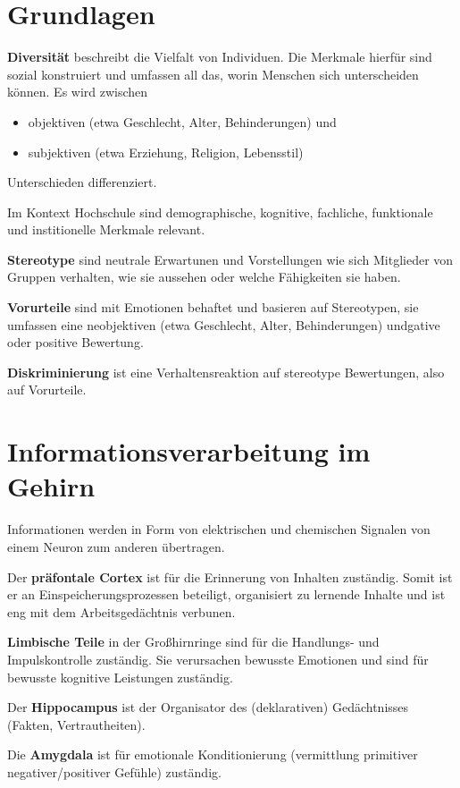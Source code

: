 \documentclass[twocolumn]{article}
\newcommand{\term}[1]{\textbf{#1}}
\begin{document}
\section{Grundlagen}

\term{Diversität} beschreibt die Vielfalt von Individuen. Die Merkmale hierfür sind sozial konstruiert und umfassen all das, worin Menschen sich unterscheiden können. Es wird zwischen 
\begin{itemize}
    \item objektiven (etwa Geschlecht, Alter, Behinderungen) und
    \item subjektiven (etwa Erziehung, Religion, Lebensstil)
\end{itemize} 
Unterschieden differenziert.

Im Kontext Hochschule sind demographische, kognitive, fachliche, funktionale und institionelle Merkmale relevant.

\term{Stereotype} sind neutrale Erwartunen und Vorstellungen wie sich Mitglieder von Gruppen verhalten, wie sie aussehen oder welche Fähigkeiten sie haben.

\term{Vorurteile} sind mit Emotionen behaftet und basieren auf Stereotypen, sie umfassen eine neobjektiven (etwa Geschlecht, Alter, Behinderungen) undgative oder positive Bewertung.

\term{Diskriminierung} ist eine Verhaltensreaktion auf stereotype Bewertungen, also auf Vorurteile.

\section{Informationsverarbeitung im Gehirn}

Informationen werden in Form von elektrischen und chemischen Signalen von einem Neuron zum anderen übertragen.

Der \term{präfontale Cortex} ist für die Erinnerung von Inhalten zuständig. Somit ist er an Einspeicherungsprozessen beteiligt, organisiert zu lernende Inhalte und ist eng mit dem Arbeitsgedächtnis verbunen. 

\term{Limbische Teile} in der Großhirnringe sind für die Handlungs- und Impulskontrolle zuständig. Sie verursachen bewusste Emotionen und sind für bewusste kognitive Leistungen zuständig.

Der \term{Hippocampus} ist der Organisator des (deklarativen) Gedächtnisses (Fakten, Vertrautheiten).

Die \term{Amygdala} ist für emotionale Konditionierung (vermittlung primitiver negativer/positiver Gefühle) zuständig.
\end{document}
